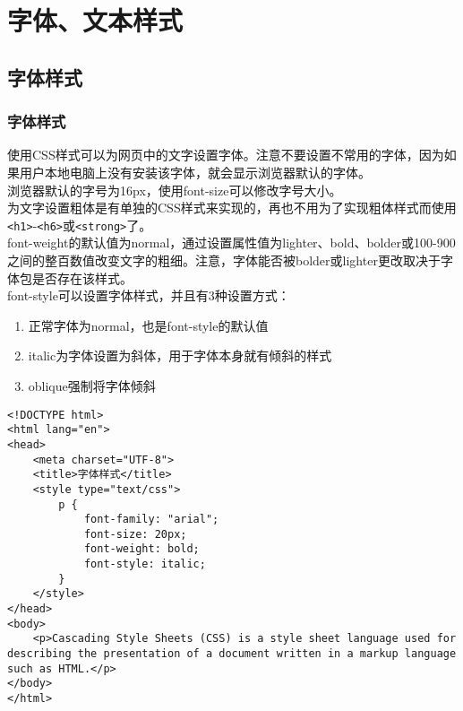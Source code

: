 \chapter{字体、文本样式}

\section{字体样式}

\subsection{字体样式}

使用CSS样式可以为网页中的文字设置字体。注意不要设置不常用的字体，因为如果用户本地电脑上没有安装该字体，就会显示浏览器默认的字体。 \\

浏览器默认的字号为16px，使用font-size可以修改字号大小。 \\

为文字设置粗体是有单独的CSS样式来实现的，再也不用为了实现粗体样式而使用\lstinline|<h1>|-\lstinline|<h6>|或\lstinline|<strong>|了。 \\

font-weight的默认值为normal，通过设置属性值为lighter、bold、bolder或100-900之间的整百数值改变文字的粗细。注意，字体能否被bolder或lighter更改取决于字体包是否存在该样式。 \\

font-style可以设置字体样式，并且有3种设置方式：

\begin{enumerate}
    \item 正常字体为normal，也是font-style的默认值
    \item italic为字体设置为斜体，用于字体本身就有倾斜的样式
    \item oblique强制将字体倾斜
\end{enumerate}

\begin{lstlisting}[style=htmlcssjs, title=字体样式]
<!DOCTYPE html>
<html lang="en">
<head>
    <meta charset="UTF-8">
    <title>字体样式</title>
    <style type="text/css">
        p {
            font-family: "arial";
            font-size: 20px;
            font-weight: bold;
            font-style: italic;
        }   
    </style>
</head>
<body>
    <p>Cascading Style Sheets (CSS) is a style sheet language used for describing the presentation of a document written in a markup language such as HTML.</p>
</body>
</html>
\end{lstlisting}

